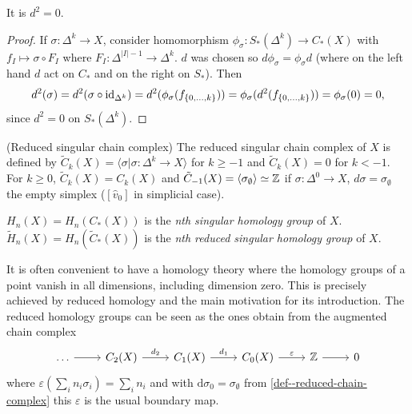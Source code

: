 \documentclass[a4paper,11pt]{article}
\begin{document}
			\begin{lemma}
				It is $d^2=0$.
			\end{lemma}
			\begin{proof}
				If $\sigma:\Delta^{k}\rightarrow X$, consider homomorphism $\phi_\sigma:S_\ast(\Delta^{k})\rightarrow C_\ast(X)$ with $f_I\mapsto\sigma \circ F_I$ where $F_I:\Delta^{|I|-1}\rightarrow \Delta^{k}$. $d$ was chosen so $d\phi_\sigma=\phi_\sigma d$ (where on the left hand $d$ act on $C_\ast$ and on the right on $S_\ast$). Then 
				\begin{equation*}
					d^2(\sigma)=d^2(\sigma \circ \operatorname{id}_{\Delta^{k}})=d^2(\phi_\sigma(f_{\{0,\dots,k\}}))=\phi_\sigma(d^2(f_{\{0,\dots,k\}}))=\phi_\sigma(0)=0,
				\end{equation*}
				since $d^2=0$ on $S_\ast(\Delta^{k})$.
			\end{proof}

			\begin{defi}\label{def--reduced-chain-complex}(Reduced singular chain complex)
				The reduced singular chain complex of $X$ is defined by $\tilde{C}_k(X)=\langle\sigma|\sigma:\Delta^{k}\rightarrow X\rangle$ for $k\ge -1$ and $\tilde{C}_k(X)=0$ for $k<-1$. For $k\ge0$, $\tilde{C}_k(X)=C_k(X)$ and $\tilde{C}_{-1}(X)=\langle\sigma_\emptyset\rangle\simeq\mathbb{Z}$ if $\sigma:\Delta^0\rightarrow X$, $d\sigma=\sigma_{\emptyset}$ the empty simplex ($[\hat{v}_0]$ in simplicial case).
			\end{defi}

			\begin{defi}
				$H_n(X)=H_n(C_\ast(X))$ is the \textit{nth singular homology group} of $X$. $\tilde{H}_n(X)=H_n(\tilde{C}_\ast(X))$ is the \textit{nth reduced singular homology group} of $X$.
			\end{defi}

			\begin{remark}
				It is often convenient to have a homology theory where the homology groups of a point vanish in all dimensions, including dimension zero. This is precisely achieved by reduced homology and the main motivation for its introduction. The reduced homology groups can be seen as the ones obtain from the augmented chain complex
				\begin{equation*}
					\begin{tikzcd}
						\dots\ar[r] & C_2(X)\ar[r,"d_2"] & C_1(X)\ar[r,"d_1"] & C_0(X)\ar[r,"\varepsilon"] & \Z \ar[r] & 0
					\end{tikzcd}
				\end{equation*}
				where $\varepsilon(\sum_i n_i\sigma_i)=\sum_i n_i$ and with $\mathrm{d}\sigma_0=\sigma_{\emptyset}$ from \autoref{def--reduced-chain-complex} this $\varepsilon$ is the usual boundary map.
			\end{remark}
\end{document}
